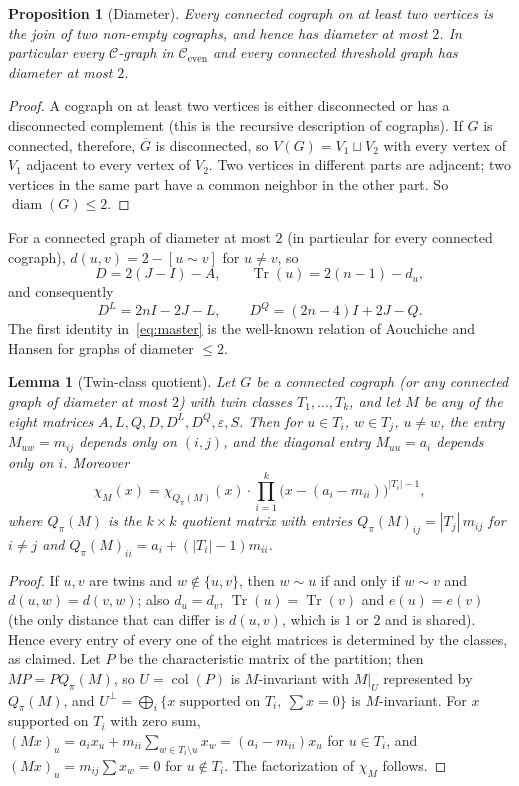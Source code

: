 \documentclass[11pt]{article}
\theoremstyle{plain}
\newtheorem{lemma}[theorem]{Lemma}
\newtheorem{proposition}[theorem]{Proposition}
\theoremstyle{definition}
\theoremstyle{remark}
\DeclareMathOperator{\diam}{diam}
\DeclareMathOperator{\Tr}{Tr}
\begin{document}
	\begin{proposition}[Diameter]
		\label{prop:diam2}
		Every connected cograph on at least two vertices is the join of two non-empty cographs, and hence has diameter at most $2$. In particular every $\mathcal{C}$-graph in $\mathcal{C}_{\mathrm{even}}$ and every connected threshold graph has diameter at most $2$.
	\end{proposition}
	\begin{proof}
		A cograph on at least two vertices is either disconnected or has a disconnected complement (this is the recursive description of cographs). If $G$ is connected, therefore, $\overline G$ is disconnected, so $V(G)=V_1\sqcup V_2$ with every vertex of $V_1$ adjacent to every vertex of $V_2$. Two vertices in different parts are adjacent; two vertices in the same part have a common neighbor in the other part. So $\diam(G)\le2$. \qedhere
	\end{proof}
	
	For a connected graph of diameter at most $2$ (in particular for every connected cograph), $d(u,v)=2-[u\sim v]$ for $u\ne v$, so
	\begin{equation}\label{eq:diam2}
		D=2(J-I)-A,\qquad \Tr(u)=2(n-1)-d_u,
	\end{equation}
	and consequently
	\begin{equation}\label{eq:master}
		D^L=2nI-2J-L,\qquad D^Q=(2n-4)I+2J-Q.
	\end{equation}
	The first identity in~\eqref{eq:master} is the well-known relation of Aouchiche and Hansen \cite{AouchicheHansen2013} for graphs of diameter $\le2$.
	
	\begin{lemma}[Twin-class quotient]
		\label{lem:quotient}
		Let $G$ be a connected cograph (or any connected graph of diameter at most $2$) with twin classes $T_1,\ldots,T_k$, and let $M$ be any of the eight matrices $A,L,Q,D,D^L,D^Q,\varepsilon,S$. Then for $u\in T_i$, $w\in T_j$, $u\ne w$, the entry $M_{uw}=m_{ij}$ depends only on $(i,j)$, and the diagonal entry $M_{uu}=a_i$ depends only on $i$. Moreover
		\[
		\chi_M(x)=\chi_{Q_\pi(M)}(x)\cdot\prod_{i=1}^k\bigl(x-(a_i-m_{ii})\bigr)^{|T_i|-1},
		\]
		where $Q_\pi(M)$ is the $k\times k$ quotient matrix with entries $Q_\pi(M)_{ij}=|T_j|\,m_{ij}$ for $i\ne j$ and $Q_\pi(M)_{ii}=a_i+(|T_i|-1)m_{ii}$.
	\end{lemma}
	\begin{proof}
		If $u,v$ are twins and $w\notin\{u,v\}$, then $w\sim u$ if and only if $w\sim v$ and $d(u,w)=d(v,w)$; also $d_u=d_v$, $\Tr(u)=\Tr(v)$ and $e(u)=e(v)$ (the only distance that can differ is $d(u,v)$, which is $1$ or $2$ and is shared). Hence every entry of every one of the eight matrices is determined by the classes, as claimed. Let $P$ be the characteristic matrix of the partition; then $MP=PQ_\pi(M)$, so $U=\operatorname{col}(P)$ is $M$-invariant with $M|_U$ represented by $Q_\pi(M)$, and $U^\perp=\bigoplus_i\{x\text{ supported on }T_i,\ \sum x=0\}$ is $M$-invariant. For $x$ supported on $T_i$ with zero sum, $(Mx)_u=a_ix_u+m_{ii}\sum_{w\in T_i\setminus u}x_w=(a_i-m_{ii})x_u$ for $u\in T_i$, and $(Mx)_u=m_{ij}\sum x_w=0$ for $u\notin T_i$. The factorization of $\chi_M$ follows. \qedhere
	\end{proof}
	
\end{document}
